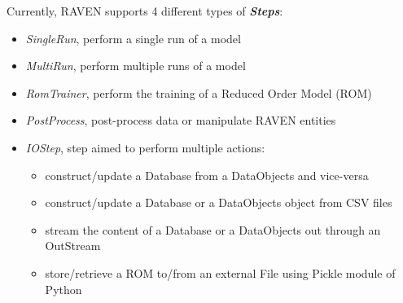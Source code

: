 Currently, RAVEN supports 4 different types of \textit{\textbf{Steps}}:
\begin{itemize}
  \item \textit{SingleRun}, perform a single run of a model
  \item \textit{MultiRun}, perform multiple runs of a model
  \item \textit{RomTrainer}, perform the training of a Reduced Order Model (ROM)
  \item \textit{PostProcess}, post-process data or manipulate RAVEN entities
  \item \textit{IOStep}, step aimed to perform multiple actions:
  \begin{itemize}
    \item construct/update a Database from a DataObjects and vice-versa
    \item construct/update a Database or a DataObjects object from CSV files
    \item stream the content of a Database or a DataObjects out through an OutStream
    \item store/retrieve a ROM to/from an external File using Pickle module of Python
  \end{itemize}
\end{itemize}

